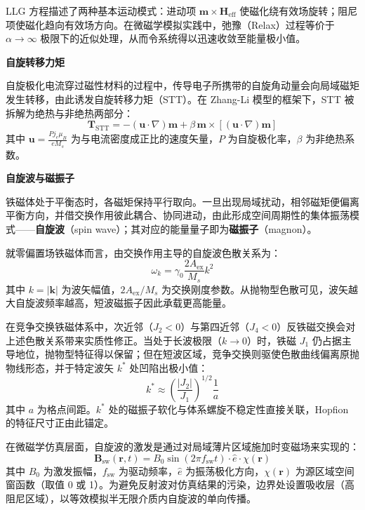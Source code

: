 LLG 方程描述了两种基本运动模式：进动项 $\mathbf{m} \times \mathbf{H}_{\text{eff}}$ 使磁化绕有效场旋转；阻尼项使磁化趋向有效场方向。在微磁学模拟实践中，弛豫（Relax）过程等价于 $\alpha \to \infty$ 极限下的近似处理，从而令系统得以迅速收敛至能量极小值。

\par\noindent\textbf{自旋转移力矩}\par\nobreak

自旋极化电流穿过磁性材料的过程中，传导电子所携带的自旋角动量会向局域磁矩发生转移，由此诱发自旋转移力矩（STT）。在 Zhang-Li 模型的框架下，STT 被拆解为绝热与非绝热两部分：
\begin{equation}
  \mathbf{T}_{\text{STT}} = -(\mathbf{u} \cdot \nabla)\mathbf{m} + \beta \, \mathbf{m} \times [(\mathbf{u} \cdot \nabla)\mathbf{m}]
  \label{eq:stt}
\end{equation}
其中 $\mathbf{u} = \frac{P j_e \mu_B}{e M_s}$ 为与电流密度成正比的速度矢量，$P$ 为自旋极化率，$\beta$ 为非绝热系数。


\par\noindent\textbf{自旋波与磁振子}\par\nobreak

铁磁体处于平衡态时，各磁矩保持平行取向。一旦出现局域扰动，相邻磁矩便偏离平衡方向，并借交换作用彼此耦合、协同进动，由此形成空间周期性的集体振荡模式——\textbf{自旋波}（spin wave）；其对应的能量量子即为\textbf{磁振子}（magnon）。

就零偏置场铁磁体而言，由交换作用主导的自旋波色散关系为：
\begin{equation}
  \omega_k = \gamma_0 \frac{2A_{\text{ex}}}{M_s} k^2
  \label{eq:sw-dispersion}
\end{equation}
其中 $k = |\mathbf{k}|$ 为波矢幅值，$2A_{\text{ex}}/M_s$ 为交换刚度参数。从抛物型色散可见，波矢越大自旋波频率越高，短波磁振子因此承载更高能量。

在竞争交换铁磁体系中，次近邻（$J_2 < 0$）与第四近邻（$J_4 < 0$）反铁磁交换会对上述色散关系带来实质性修正。当处于长波极限（$k \to 0$）时，铁磁 $J_1$ 仍占据主导地位，抛物型特征得以保留；但在短波区域，竞争交换则驱使色散曲线偏离原抛物线形态，并于特定波矢 $k^*$ 处凹陷出极小值：
\begin{equation}
  k^* \approx \left(\frac{|J_2|}{J_1}\right)^{1/2} \frac{1}{a}
  \label{eq:sw-kstar}
\end{equation}
其中 $a$ 为格点间距。$k^*$ 处的磁振子软化与体系螺旋不稳定性直接关联，Hopfion 的特征尺寸正由此锚定。

在微磁学仿真层面，自旋波的激发是通过对局域薄片区域施加时变磁场来实现的：
\begin{equation}
  \mathbf{B}_{\text{sw}}(\mathbf{r}, t) = B_0 \sin(2\pi f_{\text{sw}} t) \cdot \hat{e} \cdot \chi(\mathbf{r})
  \label{eq:sw-excitation}
\end{equation}
其中 $B_0$ 为激发振幅，$f_{\text{sw}}$ 为驱动频率，$\hat{e}$ 为振荡极化方向，$\chi(\mathbf{r})$ 为源区域空间窗函数（取值 0 或 1）。为避免反射波对仿真结果的污染，边界处设置吸收层（高阻尼区域），以等效模拟半无限介质内自旋波的单向传播。

